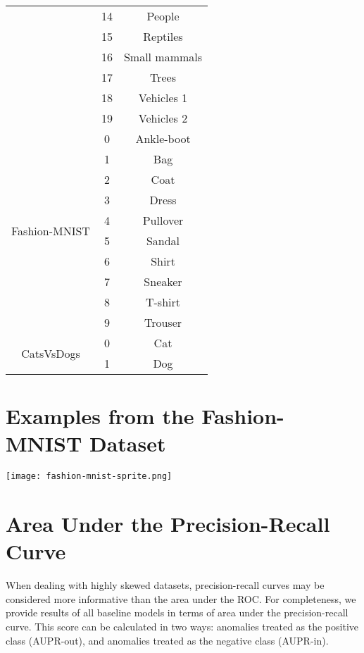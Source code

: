 \documentclass{article}
\begin{document}
\begin{table}[!ht]
\begin{tabular}{ c c c }
                            & 14 & People\\
                            & 15 & Reptiles\\
                            & 16 & Small mammals\\
                            & 17 & Trees\\
                            & 18 & Vehicles 1\\
                            & 19 & Vehicles 2\\
\midrule
\multirow{10}{*}{Fashion-MNIST} & 0 & Ankle-boot\\
                                & 1 & Bag\\
                                & 2 & Coat\\
                                & 3 & Dress\\
                                & 4 & Pullover\\
                                & 5 & Sandal\\
                                & 6 & Shirt\\
                                & 7 & Sneaker\\
                                & 8 & T-shirt\\
                                & 9 & Trouser\\
\midrule
\multirow{2}{*}{CatsVsDogs} & 0 & Cat\\
                            & 1 & Dog\\

\bottomrule[1.5pt]
\end{tabular}
\end{table}

\section{Examples from the Fashion-MNIST Dataset}
\texttt{[image: fashion-mnist-sprite.png]}

\section{Area Under the Precision-Recall Curve}
When dealing with highly skewed datasets, precision-recall curves may be considered more informative
than the area under the ROC.
For completeness, we provide results of all baseline models in terms of area under the precision-recall curve. 
This score can be calculated in two ways: anomalies treated as the positive class (AUPR-out), and anomalies treated as the negative class (AUPR-in).
\end{document}
